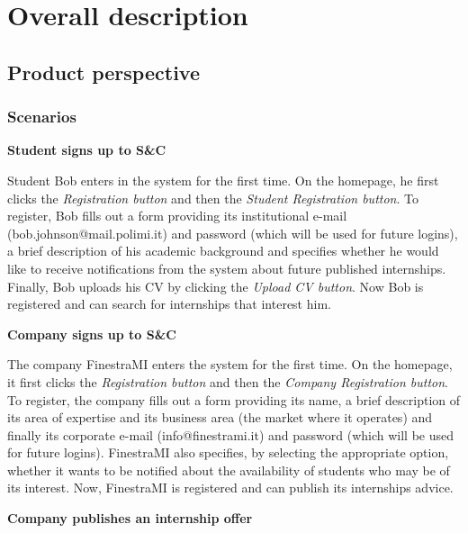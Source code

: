 \setchapterpreamble[u]{\margintoc}
\chapter{Overall description}

\section{Product perspective}
	\subsection{Scenarios}
		\textbf{Student signs up to S\&C}
		\begin{flushleft}
			Student Bob enters in the system for the first time. On the homepage, he first clicks the \emph{Registration button} and then the \emph{Student Registration button}. To register, Bob fills out a form providing its institutional e-mail (bob.johnson@mail.polimi.it) and password (which will be used for future logins), a brief description of his academic background and specifies whether he would like to receive notifications from the system about future published internships. Finally, Bob uploads his CV by clicking the \emph{Upload CV button}. Now Bob is registered and can search for internships that interest him.
		\end{flushleft}
		\textbf{Company signs up to S\&C}
		\begin{flushleft}
			The company FinestraMI enters the system for the first time. On the homepage, it first clicks the \emph{Registration button} and then the \emph{Company Registration button}. To register, the company fills out a form providing its name, a brief description of its area of expertise and its business area (the market where it operates) and finally its corporate e-mail (info@finestrami.it) and password (which will be used for future logins). FinestraMI also specifies, by selecting the appropriate option, whether it wants to be notified about the availability of students who may be of its interest. Now, FinestraMI is registered and can publish its internships advice.
		\end{flushleft}
		\textbf{Company publishes an internship offer}
